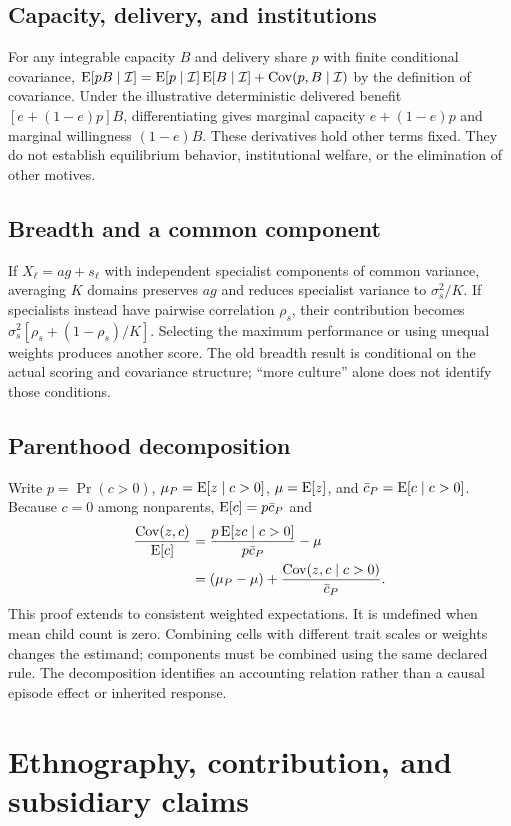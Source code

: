 \subsection{Capacity, delivery, and institutions}
For any integrable capacity $B$ and delivery share $p$ with finite conditional covariance,
$\operatorname{E}[pB\mid\mathcal I]=\operatorname{E}[p\mid\mathcal I]\operatorname{E}[B\mid\mathcal I]+\operatorname{Cov}(p,B\mid\mathcal I)$ by the definition of covariance. Under the illustrative deterministic delivered benefit $[e+(1-e)p]B$, differentiating gives marginal capacity $e+(1-e)p$ and marginal willingness $(1-e)B$. These derivatives hold other terms fixed. They do not establish equilibrium behavior, institutional welfare, or the elimination of other motives.

\subsection{Breadth and a common component}
If $X_\ell=ag+s_\ell$ with independent specialist components of common variance, averaging $K$ domains preserves $ag$ and reduces specialist variance to $\sigma_s^2/K$. If specialists instead have pairwise correlation $\rho_s$, their contribution becomes $\sigma_s^2[\rho_s+(1-\rho_s)/K]$. Selecting the maximum performance or using unequal weights produces another score. The old breadth result is conditional on the actual scoring and covariance structure; ``more culture'' alone does not identify those conditions.

\subsection{Parenthood decomposition}
Write $p=\Pr(c>0)$, $\mu_P=\operatorname{E}[z\mid c>0]$, $\mu=\operatorname{E}[z]$, and $\bar c_P=\operatorname{E}[c\mid c>0]$. Because $c=0$ among nonparents, $\operatorname{E}[c]=p\bar c_P$ and
\begin{align}
\frac{\operatorname{Cov}(z,c)}{\operatorname{E}[c]}&=\frac{p\operatorname{E}[zc\mid c>0]}{p\bar c_P}-\mu\\
&=(\mu_P-\mu)+\frac{\operatorname{Cov}(z,c\mid c>0)}{\bar c_P}.
\end{align}
This proof extends to consistent weighted expectations. It is undefined when mean child count is zero. Combining cells with different trait scales or weights changes the estimand; components must be combined using the same declared rule. The decomposition identifies an accounting relation rather than a causal episode effect or inherited response.

\section{Ethnography, contribution, and subsidiary claims}

